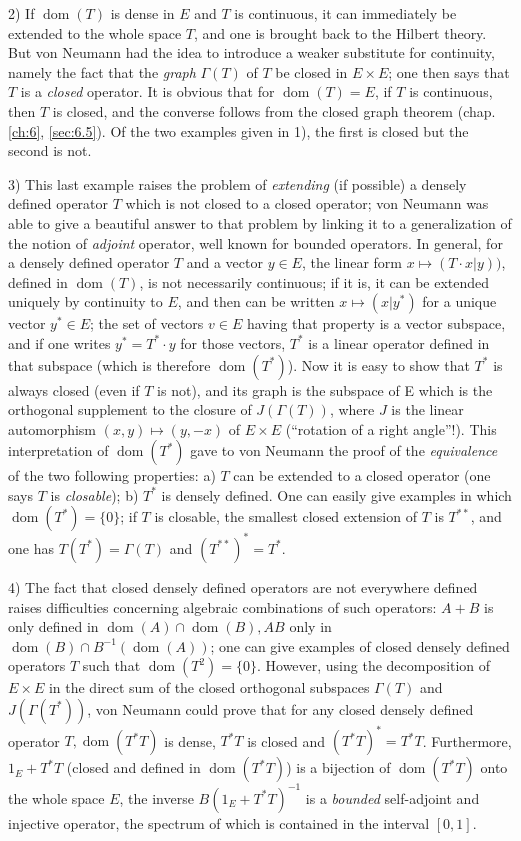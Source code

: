 \documentclass[12pt,a4paper,leqno,twoside]{extbook}
\newcommand{\dom}{\operatorname{dom}}
\begin{document}
2) If \(\dom(T)\) is dense in \(E\) and \(T\) is continuous, it can immediately be extended to the whole space \(T\), and one is brought back to the Hilbert theory. But von Neumann had the idea to introduce a weaker substitute for continuity, namely the fact that the \emph{graph} \(\Gamma(T)\) of \(T\) be closed in \(E \times E\); one then says that \(T\) is a \emph{closed} operator. It is obvious that for \(\dom(T) = E\), if \(T\) is continuous, then \(T\) is closed, and the converse follows from the closed graph theorem (chap. \ref{ch:6}, \ref{sec:6.5}). Of the two examples given in 1), the first is closed but the second is not.

3) This last example raises the problem of \emph{extending} (if possible) a densely defined operator \(T\) which is not closed to a closed operator; von Neumann was able to give a beautiful answer to that problem by linking it to a generalization of the notion of \emph{adjoint} operator, well known for bounded operators. In general, for a densely defined operator \(T\) and a vector \(y \in E\), the linear form \(x \mapsto (T \cdot x | y))\), defined in \(\dom(T)\), is not necessarily continuous; if it is, it can be extended uniquely by continuity to \(E\), and then can be written \(x \mapsto (x | y^*)\) for a unique vector \(y^* \in E\); the set of vectors \(v \in E\) having that property is a vector subspace, and if one writes \(y^* = T^* \cdot y\) for those vectors, \(T^*\) is a linear operator defined in that subspace (which is therefore \(\dom(T^*)\)). Now it is easy to show that \(T^*\) is always closed (even if \(T\) is not), and its graph is the subspace of E which is the orthogonal supplement to the closure of \(J(\Gamma(T))\), where \(J\) is the linear automorphism \((x,y) \mapsto (y,-x)\) of \(E \times E\) (``rotation of a right angle''!). This interpretation of \(\dom(T^*)\) gave to von Neumann the proof of the \emph{equivalence} of the two following properties: a) \(T\) can be extended to a closed operator (one says \(T\) is \emph{closable}); b) \(T^*\) is densely defined. One can easily give examples in which \(\dom(T^*) = \{0\}\); if \(T\) is closable, the smallest closed extension of \(T\) is \(T^{**}\), and one has \(T(T^*) = \Gamma(T)\) and \((T^{**})^* = T^*\).

4) The fact that closed densely defined operators are not everywhere defined raises difficulties concerning algebraic combinations of such operators: \(A + B\) is only defined in \(\dom(A) \cap \dom(B), AB\) only in \(\dom(B) \cap B^{-1}(\dom(A))\); one can give examples of closed densely defined operators \(T\) such that \(\dom(T^2) = \{0\}\). However, using the decomposition of \(E \times E\) in the direct sum of the closed orthogonal subspaces \(\Gamma(T)\) and \(J(\Gamma(T^*))\), von Neumann could prove that for any closed densely defined operator \(T, \dom(T^* T)\) is dense, \(T^* T\) is closed and \((T^* T)^* = T^* T\). Furthermore, \(1_E + T^* T\) (closed and defined in \(\dom(T^* T)\)) is a bijection of \(\dom(T^* T)\) onto the whole space \(E\), the inverse \(B(1_E + T^* T)^{-1}\) is a \emph{bounded} self-adjoint and injective operator, the spectrum of which is contained in the interval \([0,1]\).
\end{document}
